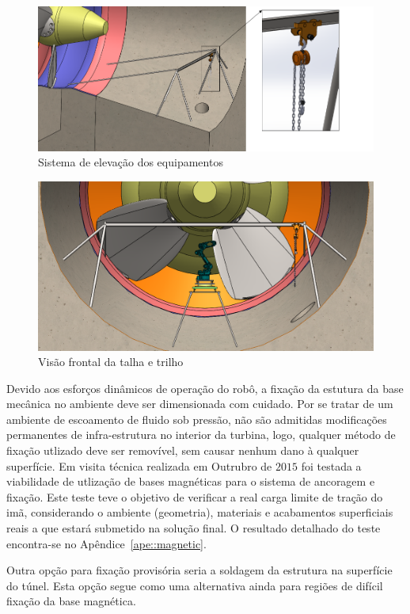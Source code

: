\begin{figure}[h!]
   \centering
   \includegraphics[width=0.8\columnwidth]{figs/bases/talha}
   \caption{Sistema de elevação dos equipamentos}
   \label{fig::talha}
\end{figure}

\begin{figure}[h!]
   \centering
   \includegraphics[width=0.8\columnwidth]{figs/bases/talha_trilho}
   \caption{Visão frontal da talha e trilho}
   \label{fig::talha_trilho}
\end{figure}

Devido aos esforços dinâmicos de operação do robô, a fixação da estutura da
base mecânica no ambiente deve ser dimensionada com cuidado. Por se
tratar de um ambiente de escoamento de fluido sob pressão, não são admitidas
modificações permanentes de infra-estrutura no interior da turbina, logo,
qualquer método de fixação utlizado deve ser removível, sem causar nenhum dano
à qualquer superfície. Em visita técnica realizada em Outrubro de $2015$ foi
testada a viabilidade de utlização de bases magnéticas para o sistema de
ancoragem e fixação. Este teste teve o objetivo de verificar a real carga limite de tração
do imã, considerando o ambiente (geometria), materiais e acabamentos
superficiais reais a que estará submetido na solução final. O resultado
detalhado do teste encontra-se no Apêndice~\ref{ape::magnetic}.

Outra opção para fixação provisória seria a soldagem da estrutura na
superfície do túnel. Esta opção segue como uma alternativa ainda para regiões
de difícil fixação da base magnética.